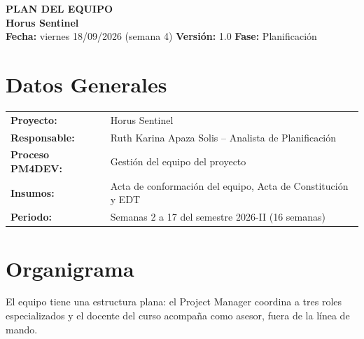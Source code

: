 \documentclass[11pt,a4paper]{article}
\begin{document}
\begin{center}
    {\Large \textbf{\textcolor{AzulUNA}{PLAN DEL EQUIPO}}}\\[3pt]
    {\normalsize \textbf{Horus Sentinel}}\\[4pt]
    \footnotesize \textbf{Fecha:} viernes 18/09/2026 (semana 4) \quad \textbar\quad \textbf{Versión:} 1.0 \quad \textbar\quad \textbf{Fase:} Planificación
\end{center}

\vspace{0.1cm}

\section{Datos Generales}
\noindent\begin{tabularx}{\textwidth}{@{}P{4.2cm} L@{}}
\toprule
\textbf{Proyecto:} & Horus Sentinel \\
\textbf{Responsable:} & Ruth Karina Apaza Solis -- Analista de Planificación \\
\textbf{Proceso PM4DEV:} & Gestión del equipo del proyecto \\
\textbf{Insumos:} & Acta de conformación del equipo, Acta de Constitución y EDT \\
\textbf{Periodo:} & Semanas 2 a 17 del semestre 2026-II (16 semanas) \\
\bottomrule
\end{tabularx}

\section{Organigrama}
El equipo tiene una estructura plana: el Project Manager coordina a tres roles especializados y el docente del curso acompaña como asesor, fuera de la línea de mando.
\end{document}
